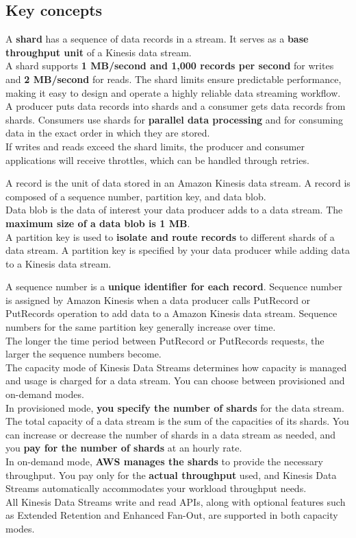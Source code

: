 \documentclass[12pt, letterpaper, twoside]{article}
\begin{document}
\subsection{Key concepts}
A \textbf{shard} has a sequence of data records in a stream. It serves as a \textbf{base throughput unit} of a Kinesis data stream.\\
A shard supports \textbf{1 MB/second and 1,000 records per second} for writes and \textbf{2 MB/second} for reads. The shard limits ensure 
predictable performance, making it easy to design and operate a highly reliable data streaming workflow. A producer puts data records into 
shards and a consumer gets data records from shards. Consumers use shards for \textbf{parallel data processing} and for consuming data in 
the exact order in which they are stored.
\\If writes and reads exceed the shard limits, the producer and consumer applications will receive throttles, which can be handled through retries.

A record is the unit of data stored in an Amazon Kinesis data stream. A record is composed of a sequence number, partition key, and data blob.\\
Data blob is the data of interest your data producer adds to a data stream. The \textbf{maximum size of a data blob is 1 MB}.\\

A partition key is used to \textbf{isolate and route records} to different shards of a data stream. A partition key is specified by your data 
producer while adding data to a Kinesis data stream.

A sequence number is a \textbf{unique identifier for each record}. Sequence number is assigned by Amazon Kinesis when a data producer calls 
PutRecord or PutRecords operation to add data to a Amazon Kinesis data stream. Sequence numbers for the same partition key generally 
increase over time.\\
The longer the time period between PutRecord or PutRecords requests, the larger the sequence numbers become.\\

The capacity mode of Kinesis Data Streams determines how capacity is managed and usage is charged for a data stream. You can choose 
between provisioned and on-demand modes.\\
In provisioned mode, \textbf{you specify the number of shards} for the data stream. The total capacity of a data stream is the sum of 
the capacities of its shards. You can increase or decrease the number of shards in a data stream as needed, and you \textbf{pay for 
the number of shards} at an hourly rate.\\
In on-demand mode, \textbf{AWS manages the shards} to provide the necessary throughput. You pay only for the \textbf{actual throughput} 
used, and Kinesis Data Streams automatically accommodates your workload throughput needs.\\
All Kinesis Data Streams write and read APIs, along with optional features such as Extended Retention and Enhanced Fan-Out, are supported 
in both capacity modes.\\
\end{document}
